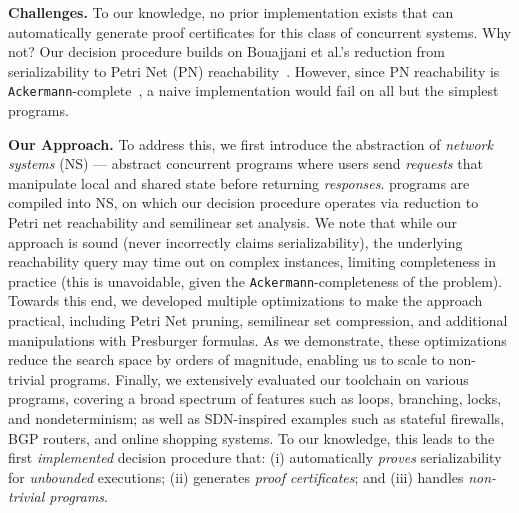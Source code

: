 \smallskip
\noindent
\textbf{Challenges.}
To our knowledge, no prior implementation exists that can automatically generate proof certificates for this class of concurrent systems.
Why not?
Our decision procedure builds on Bouajjani et al.'s reduction from serializability to Petri Net (PN) reachability~\cite{BoEmEnHa13}. However, since PN reachability is \texttt{Ackermann}-complete~\cite{CzWo22}, a naive implementation would fail on all but the simplest programs. 

\smallskip
\noindent
\textbf{Our Approach.}
To address this, we first introduce the abstraction of \textit{network systems} (NS) --- abstract concurrent programs where users send \textit{requests} that manipulate local and shared state before returning \textit{responses}. \toolname{} programs are compiled into NS, on which our decision procedure operates via reduction to Petri net reachability and semilinear set analysis.
%
We note that while our approach is sound (never incorrectly claims serializability), the underlying reachability query may time out on complex instances, limiting completeness in practice (this is unavoidable, given the \texttt{Ackermann}-completeness of the problem).
%
Towards this end, we developed multiple optimizations to make the approach practical, including Petri Net pruning, semilinear set compression, and additional manipulations with Presburger formulas.
As we demonstrate, these optimizations reduce the search space by orders of magnitude, enabling us to scale to non-trivial programs.
%
Finally, 
we extensively evaluated our \toolname{} toolchain on various programs, covering a broad spectrum of features such as loops, branching, locks, and nondeterminism; as well as SDN-inspired examples such as stateful firewalls, BGP routers, and online shopping systems.
%
To our knowledge, this leads to the first \emph{implemented} decision procedure that: (i) automatically \textit{proves} serializability for \textit{unbounded} executions; (ii) generates \textit{proof certificates}; and (iii) handles \textit{non-trivial programs}.


